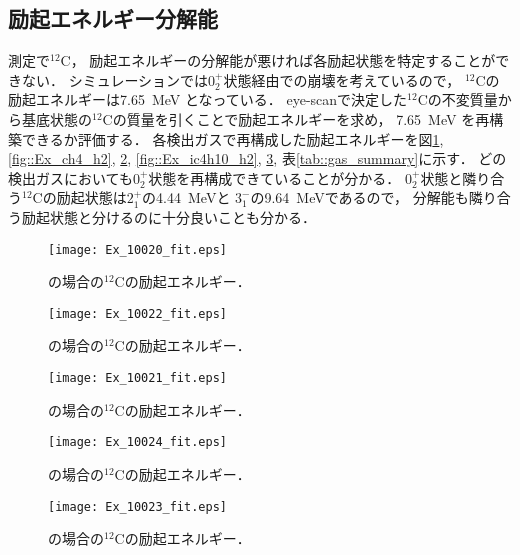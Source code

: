 \documentclass[../master]{subfiles}
\begin{document}
\subsection{励起エネルギー分解能}
測定で${}^{12}\mathrm{C}$，
励起エネルギーの分解能が悪ければ各励起状態を特定することができない．
シミュレーションでは$0_2^+$状態経由での崩壊を考えているので，
${}^{12}\mathrm{C}$の励起エネルギーは\SI{7.65}{\mega\electronvolt} となっている．
eye-scanで決定した${}^{12}\mathrm{C}$の不変質量から基底状態の${}^{12}\mathrm{C}$の質量を引くことで励起エネルギーを求め，
\SI{7.65}{\mega\electronvolt} を再構築できるか評価する．
各検出ガスで再構成した励起エネルギーを図\ref{fig::Ex_ch4}, \ref{fig::Ex_ch4_h2}, \ref{fig::Ex_ch4_he},
\ref{fig::Ex_ic4h10_h2}, \ref{fig::Ex_ic4h10_he}, 表\ref{tab::gas_summary}に示す．
どの検出ガスにおいても$0_2^+$状態を再構成できていることが分かる．
$0_2^+$状態と隣り合う${}^{12}\mathrm{C}$の励起状態は$2_1^+$の\SI{4.44}{\mega\electronvolt}と
$3_1^-$の\SI{9.64}{\mega\electronvolt}であるので，
分解能も隣り合う励起状態と分けるのに十分良いことも分かる．
\begin{figure}
  \centering
  \begin{minipage}{0.45\columnwidth}
    \centering
    \texttt{[image: Ex\_10020\_fit.eps]}
    \caption{\Methane の場合の${}^{12}\mathrm{C}$の励起エネルギー．}
    \label{fig::Ex_ch4}
  \end{minipage}
\end{figure}
\begin{figure}
  \centering
  \begin{minipage}{0.45\columnwidth}
    \centering
    \texttt{[image: Ex\_10022\_fit.eps]}
    \caption{\MethaneHydro の場合の${}^{12}\mathrm{C}$の励起エネルギー．}
    \label{fig::Ex_ch4_h2}
  \end{minipage}
  \begin{minipage}{0.45\columnwidth}
    \centering
    \texttt{[image: Ex\_10021\_fit.eps]}
    \caption{\MethaneHerium の場合の${}^{12}\mathrm{C}$の励起エネルギー．}
    \label{fig::Ex_ch4_he}
  \end{minipage}
\end{figure}
\begin{figure}
  \centering
  \begin{minipage}{0.45\columnwidth}
    \centering
    \texttt{[image: Ex\_10024\_fit.eps]}
    \caption{\isoButaneHydro の場合の${}^{12}\mathrm{C}$の励起エネルギー．}
    \label{fig::Ex_ic4h10_h2}
  \end{minipage}
  \begin{minipage}{0.45\columnwidth}
    \centering
    \texttt{[image: Ex\_10023\_fit.eps]}
    \caption{\isoButaneHerium の場合の${}^{12}\mathrm{C}$の励起エネルギー．}
    \label{fig::Ex_ic4h10_he}
  \end{minipage}
\end{figure}
\end{document}
